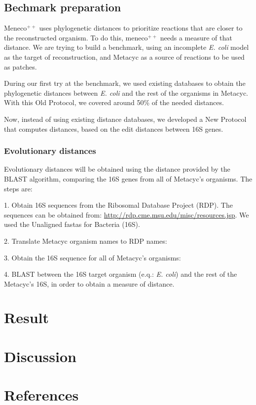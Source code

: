 \documentclass{article}
\newcommand{\Meneco}{Meneco$^{++}$\xspace}
\newcommand{\meneco}{meneco$^{++}$\xspace}
\begin{document}
\subsection{Bechmark preparation}

\Meneco uses phylogenetic distances to prioritize reactions that are closer to the reconstructed organism. To do this, \meneco needs a measure of that distance. We are trying to build a benchmark, using an incomplete \emph{E. coli} model as the target of reconstruction, and Metacyc as a source of reactions to be used as patches.

During our first try at the benchmark, we used existing databases to obtain the phylogenetic distances between \emph{E. coli} and the rest of the organisms in Metacyc. With this Old Protocol, we covered around 50\% of the needed distances.

Now, instead of using existing distance databases, we developed a New Protocol that computes distances, based on the edit distances between 16S genes.


\subsubsection{Evolutionary distances}

Evolutionary distances will be obtained using the distance provided by the BLAST algorithm, comparing the 16S genes from all of Metacyc's organisms. The steps are:

1. Obtain 16S sequences from the Ribosomal Database Project (RDP). The sequences can be obtained from: \url{http://rdp.cme.msu.edu/misc/resources.jsp}. We used the Unaligned fastas for Bacteria (16S).

2. Translate Metacyc organism names to RDP names:

3. Obtain the 16S sequence for all of Metacyc's organisms:

4. BLAST between the 16S target organism (e.q.: \emph{E. coli}) and the rest of the Metacyc's 16S, in order to obtain a measure of distance.



\section{Result}


\section{Discussion}

\section{References}
\end{document}
